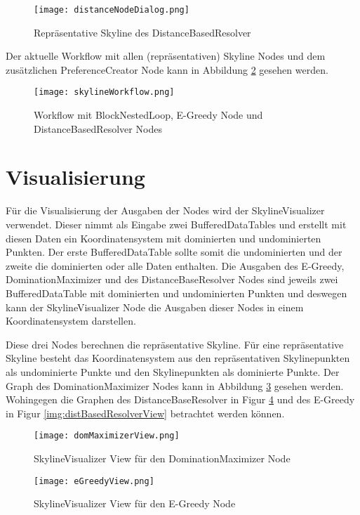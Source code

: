 \begin{figure}[H]
	\centering
	\texttt{[image: distanceNodeDialog.png]}
	\caption{Repräsentative Skyline des DistanceBasedResolver}
	\label{img:distanceOutput}
\end{figure} 

Der aktuelle Workflow mit allen (repräsentativen) Skyline Nodes und dem zusätzlichen PreferenceCreator Node kann in Abbildung \ref{img:skylineWorkflow} gesehen werden.

\begin{figure}[H]
	\centering
	\texttt{[image: skylineWorkflow.png]}
	\caption{Workflow mit BlockNestedLoop, E-Greedy Node und DistanceBasedResolver Nodes}
	\label{img:skylineWorkflow}
\end{figure} 
\section{Visualisierung}
\label{ch:Evaluierung:sec:visualize}
Für die Visualisierung der Ausgaben der Nodes wird der SkylineVisualizer verwendet. Dieser nimmt als Eingabe zwei BufferedDataTables und erstellt mit diesen Daten ein Koordinatensystem mit dominierten und undominierten Punkten. Der erste BufferedDataTable sollte somit die undominierten und der zweite die dominierten oder alle Daten enthalten. Die Ausgaben des E-Greedy, DominationMaximizer und des DistanceBaseResolver Nodes sind jeweils zwei BufferedDataTable mit dominierten und undominierten Punkten und deswegen kann der SkylineVisualizer Node die Ausgaben dieser Nodes in einem Koordinatensystem darstellen.

Diese drei Nodes berechnen die repräsentative Skyline. Für eine repräsentative Skyline besteht das Koordinatensystem aus den repräsentativen Skylinepunkten als undominierte Punkte und den Skylinepunkten als dominierte Punkte. Der Graph des DominationMaximizer Nodes kann in Abbildung \ref{img:domMaximizerView} gesehen werden. Wohingegen die Graphen des DistanceBaseResolver in Figur \ref{img:eGreedyView} und des E-Greedy in Figur \ref{img:distBasedResolverView} betrachtet werden können. 

\begin{figure}[H]
	\centering
	\texttt{[image: domMaximizerView.png]}
	\caption{SkylineVisualizer View für den DominationMaximizer Node}
	\label{img:domMaximizerView}
	
\end{figure} 
	\begin{figure}[H]
	\centering
	\texttt{[image: eGreedyView.png]}
	\caption{SkylineVisualizer View für den E-Greedy Node}
	\label{img:eGreedyView}
\end{figure} 

